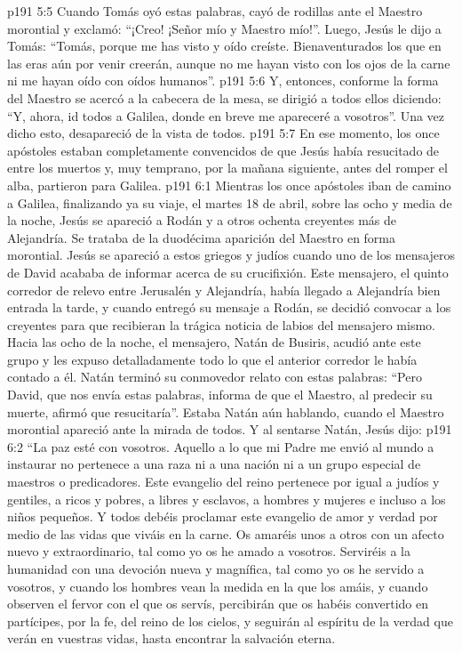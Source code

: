 \vs p191 5:5 Cuando Tomás oyó estas palabras, cayó de rodillas ante el Maestro morontial y exclamó: “¡Creo! ¡Señor mío y Maestro mío!”. Luego, Jesús le dijo a Tomás: “Tomás, porque me has visto y oído creíste. Bienaventurados los que en las eras aún por venir creerán, aunque no me hayan visto con los ojos de la carne ni me hayan oído con oídos humanos”.
\vs p191 5:6 Y, entonces, conforme la forma del Maestro se acercó a la cabecera de la mesa, se dirigió a todos ellos diciendo: “Y, ahora, id todos a Galilea, donde en breve me apareceré a vosotros”. Una vez dicho esto, desapareció de la vista de todos.
\vs p191 5:7 \pc En ese momento, los once apóstoles estaban completamente convencidos de que Jesús había resucitado de entre los muertos y, muy temprano, por la mañana siguiente, antes del romper el alba, partieron para Galilea.
\vs p191 6:1 Mientras los once apóstoles iban de camino a Galilea, finalizando ya su viaje, el martes 18 de abril, sobre las ocho y media de la noche, Jesús se apareció a Rodán y a otros ochenta creyentes más de Alejandría. Se trataba de la duodécima aparición del Maestro en forma morontial. Jesús se apareció a estos griegos y judíos cuando uno de los mensajeros de David acababa de informar acerca de su crucifixión. Este mensajero, el quinto corredor de relevo entre Jerusalén y Alejandría, había llegado a Alejandría bien entrada la tarde, y cuando entregó su mensaje a Rodán, se decidió convocar a los creyentes para que recibieran la trágica noticia de labios del mensajero mismo. Hacia las ocho de la noche, el mensajero, Natán de Busiris, acudió ante este grupo y les expuso detalladamente todo lo que el anterior corredor le había contado a él. Natán terminó su conmovedor relato con estas palabras: “Pero David, que nos envía estas palabras, informa de que el Maestro, al predecir su muerte, afirmó que resucitaría”. Estaba Natán aún hablando, cuando el Maestro morontial apareció ante la mirada de todos. Y al sentarse Natán, Jesús dijo:
\vs p191 6:2 “La paz esté con vosotros. Aquello a lo que mi Padre me envió al mundo a instaurar no pertenece a una raza ni a una nación ni a un grupo especial de maestros o predicadores. Este evangelio del reino pertenece por igual a judíos y gentiles, a ricos y pobres, a libres y esclavos, a hombres y mujeres e incluso a los niños pequeños. Y todos debéis proclamar este evangelio de amor y verdad por medio de las vidas que viváis en la carne. Os amaréis unos a otros con un afecto nuevo y extraordinario, tal como yo os he amado a vosotros. Serviréis a la humanidad con una devoción nueva y magnífica, tal como yo os he servido a vosotros, y cuando los hombres vean la medida en la que los amáis, y cuando observen el fervor con el que os servís, percibirán que os habéis convertido en partícipes, por la fe, del reino de los cielos, y seguirán al espíritu de la verdad que verán en vuestras vidas, hasta encontrar la salvación eterna.
